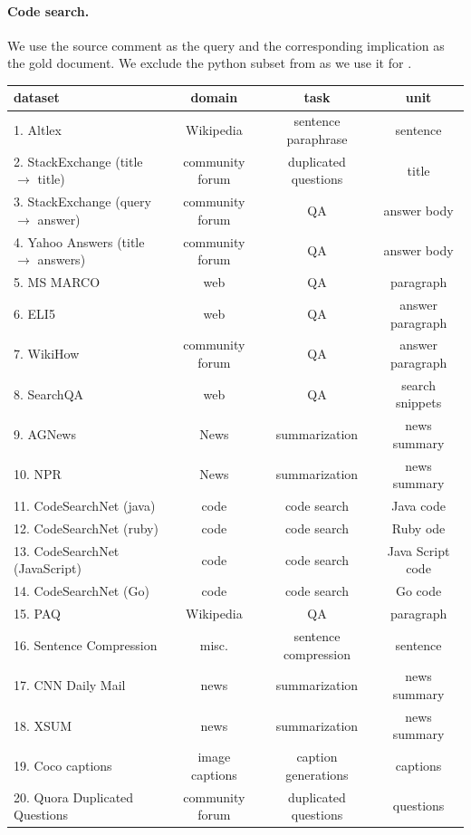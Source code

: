\paragraph{Code search.}
We use the source comment as the query and the corresponding implication as the gold document. We exclude the python subset from \rib as we use it for \task.  


\begin{table}[ht!]
\center
\small
\begin{tabular}{l   c  c  c}
\toprule 
dataset & domain & task & unit\\\midrule
1. Altlex & Wikipedia & sentence paraphrase & sentence \\ 
2. StackExchange (title $\rightarrow$ title) & community forum & duplicated questions & title  \\ 
3. StackExchange  (query $\rightarrow$ answer) & community forum& QA & answer body  \\ 
4. Yahoo Answers (title $\rightarrow$ answers) & community forum &  QA & answer body  \\ 
5. MS MARCO & web &  QA & paragraph  \\ 
6. ELI5 & web &  QA & answer paragraph  \\ 
7. WikiHow & community forum &  QA & answer paragraph  \\ 
8. SearchQA & web &  QA & search snippets \\ 
9. AGNews & News &  summarization & news summary \\ 
10. NPR & News &  summarization & news summary \\ 
11. CodeSearchNet (java) & code & code search & Java code \\ 
12. CodeSearchNet (ruby) & code & code search & Ruby ode \\ 
13. CodeSearchNet (JavaScript) & code & code search & Java Script code \\ 
14. CodeSearchNet (Go) & code & code search & Go code \\ 
15. PAQ & Wikipedia & QA & paragraph \\ 
16. Sentence Compression & misc. & sentence compression & sentence \\
17. CNN Daily Mail & news & summarization & news summary \\
18. XSUM & news & summarization & news summary \\
19. Coco captions & image captions & caption generations & captions \\
20. Quora Duplicated Questions &  community forum & duplicated questions & questions \\

\end{tabular}
\end{table}
